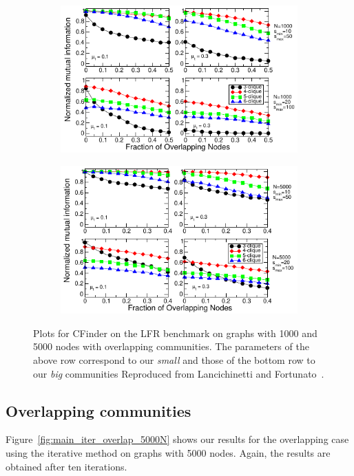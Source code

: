 \begin{figure}[h!]
    \centering
    \begin{subfigure}{0.5\textwidth}
    \centering
    \includegraphics[width=\cfinderwidth]{lfrpaper/fig6.pdf}
    \end{subfigure}%
    \begin{subfigure}{0.5\textwidth}
    \centering
    \includegraphics[width=\cfinderwidth]{lfrpaper/fig7.pdf}
    \end{subfigure}%
    \caption{
		Plots for CFinder on the LFR benchmark on graphs with 1000 and 5000
		nodes with overlapping communities. The parameters of the above row
		correspond to our \textit{small} and those of the bottom row to our
		\textit{big} communities Reproduced from Lancichinetti and
		Fortunato~\cite{LF09}.  }\label{fig:main_CFinder_overlapping}
\end{figure}



\subsection{Overlapping communities}
Figure~\ref{fig:main_iter_overlap_5000N} shows our results for the overlapping
case using the iterative method on graphs with 5000 nodes. Again, the results
are obtained after ten iterations.

